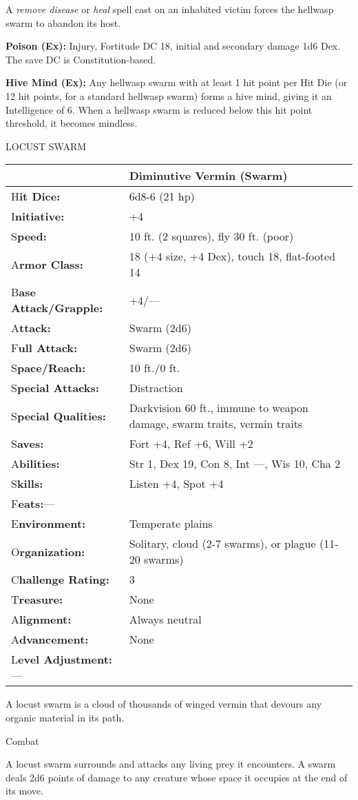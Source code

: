 \documentclass{article}
\begin{document}
A \textit{remove disease }or \textit{heal }spell cast on an inhabited victim forces 
the hellwasp swarm to abandon its host.

\textbf{Poison (Ex):} Injury, Fortitude DC 18, initial and secondary damage 1d6 
Dex. The save DC is Constitution-based.

\textbf{Hive Mind (Ex): }Any hellwasp swarm with at least 1 hit point per Hit Die 
(or 12 hit points, for a standard hellwasp swarm) forms a hive mind, giving it 
an Intelligence of 6. When a hellwasp swarm is reduced below this hit point threshold, 
it becomes mindless. 

\vspace{12pt}
LOCUST SWARM

\begin{tabular}{|>{\raggedright}p{91pt}|>{\raggedright}p{213pt}|}
\hline
  & Diminutive Vermin (Swarm)\tabularnewline
\hline
H\textbf{it Dice:} & 6d8-6 (21 hp)\tabularnewline
\hline
I\textbf{nitiative:} & +4\tabularnewline
\hline
S\textbf{peed:} & 10 ft. (2 squares), fly 30 ft. (poor)\tabularnewline
\hline
A\textbf{rmor Class:} & 18 (+4 size, +4 Dex), touch 18, flat-footed 14\tabularnewline
\hline
B\textbf{ase Attack/Grapple:} & +4/---\tabularnewline
\hline
A\textbf{ttack:} & Swarm (2d6)\tabularnewline
\hline
F\textbf{ull Attack:} & Swarm (2d6)\tabularnewline
\hline
S\textbf{pace/Reach:} & 10 ft./0 ft.\tabularnewline
\hline
S\textbf{pecial Attacks:} & Distraction\tabularnewline
\hline
S\textbf{pecial Qualities:} & Darkvision 60 ft., immune to weapon damage, swarm 
traits, vermin traits\tabularnewline
\hline
S\textbf{aves:} & Fort +4, Ref +6, Will +2\tabularnewline
\hline
A\textbf{bilities:} & Str 1, Dex 19, Con 8, Int ---, Wis 10, Cha 2\tabularnewline
\hline
S\textbf{kills:} & Listen +4, Spot +4\tabularnewline
\hline
F\textbf{eats:}--- & \tabularnewline
\hline
E\textbf{nvironment:} & Temperate plains\tabularnewline
\hline
O\textbf{rganization:} & Solitary, cloud (2-7 swarms), or plague (11-20 swarms)\tabularnewline
\hline
C\textbf{hallenge Rating:} & 3\tabularnewline
\hline
T\textbf{reasure:} & None\tabularnewline
\hline
A\textbf{lignment:} & Always neutral\tabularnewline
\hline
A\textbf{dvancement:} & None\tabularnewline
\hline
L\textbf{evel Adjustment:}--- & \tabularnewline
\hline
\end{tabular}

A locust swarm is a cloud of thousands of winged vermin that devours any organic 
material in its path.

Combat

A locust swarm surrounds and attacks any living prey it encounters. A swarm deals 
2d6 points of damage to any creature whose space it occupies at the end of its 
move.
\end{document}

